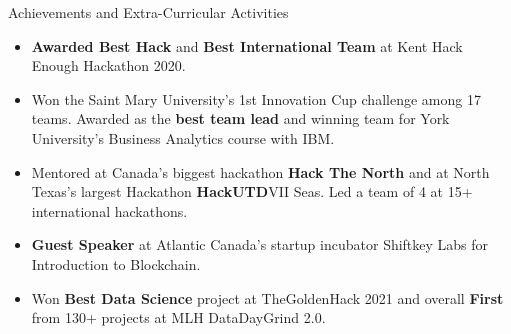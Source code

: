 \documentclass{resume} %
\begin{document}


\begin{rSection}{Achievements and Extra-Curricular Activities} 
\begin{itemize}
    \item \textbf{Awarded Best Hack} and \textbf{Best International Team} at Kent Hack Enough Hackathon 2020.
    \item Won the Saint Mary University's 1st Innovation Cup challenge among 17 teams. Awarded as the \textbf{best team lead} and winning team for York University's Business Analytics course with IBM.
    \item Mentored at Canada's biggest hackathon \textbf{Hack The North} and at North Texas's largest Hackathon \textbf{HackUTD}VII Seas. Led a team of 4 at 15+ international hackathons.
    \item \textbf{Guest Speaker} at Atlantic Canada’s startup incubator Shiftkey Labs for Introduction to Blockchain.
    \item Won \textbf{Best Data Science} project at TheGoldenHack 2021 and overall \textbf{First} from 130+ projects at MLH DataDayGrind 2.0. 
\end{itemize}
\end{rSection}
\end{document}
